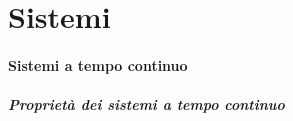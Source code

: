 \documentclass[10pt,a4paper]{article}
\begin{document}
	\section{Sistemi}
	\paragraph{Sistemi a tempo continuo}
	\subparagraph{Proprietà dei sistemi a tempo continuo}
\end{document}
